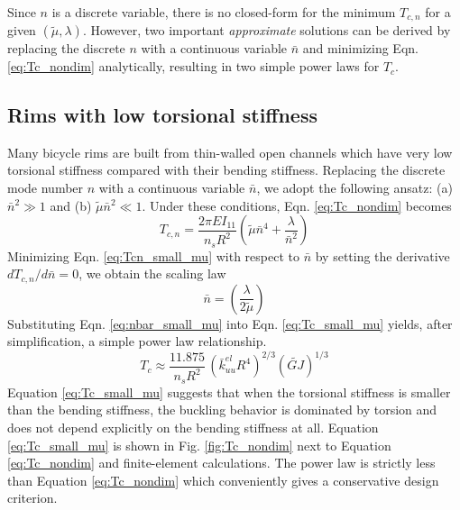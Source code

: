 \documentclass{bmd2016p}
\begin{document}
Since $n$ is a discrete variable, there is no closed-form for the minimum $T_{c,n}$ for a given $(\tilde{\mu},\lambda)$. However, two important \textit{approximate} solutions can be derived by replacing the discrete $n$ with a continuous variable $\bar{n}$ and minimizing Eqn. \ref{eq:Tc_nondim} analytically, resulting in two simple power laws for $T_c$.


\subsection{Rims with low torsional stiffness}\label{sec:powerlaw_1}
Many bicycle rims are built from thin-walled open channels which have very low torsional stiffness compared with their bending stiffness. Replacing the discrete mode number $n$ with a continuous variable $\bar{n}$, we adopt the following ansatz: (a) $\bar{n}^2 \gg 1$ and (b) $\tilde{\mu}\bar{n}^2 \ll 1$. Under these conditions, Eqn. \ref{eq:Tc_nondim} becomes
	\begin{equation}\label{eq:Tcn_small_mu}
	T_{c,n} = \frac{2\pi EI_{11}}{n_sR^2} \left( \tilde{\mu}\bar{n}^4 + \frac{\lambda}{\bar{n}^2}\right)
	\end{equation}
Minimizing Eqn. \ref{eq:Tcn_small_mu} with respect to $\bar{n}$ by setting the derivative $dT_{c,n}/d\bar{n}=0$, we obtain the scaling law
	\begin{equation}\label{eq:nbar_small_mu}
	\bar{n} = \left(\frac{\lambda}{2\tilde{\mu}} \right)
	\end{equation}
Substituting Eqn. \ref{eq:nbar_small_mu} into Eqn. \ref{eq:Tc_small_mu} yields, after simplification, a simple power law relationship.
	\begin{equation}\label{eq:Tc_small_mu}
	T_c \approx \frac{11.875}{n_sR^2} \, \left(\bar{k}_{uu}^{el}R^4 \right)^{2/3} (\widetilde{GJ})^{1/3}
	\end{equation}
Equation \ref{eq:Tc_small_mu} suggests that when the torsional stiffness is smaller than the bending stiffness, the buckling behavior is dominated by torsion and does not depend explicitly on the bending stiffness at all. Equation \ref{eq:Tc_small_mu} is shown in Fig. \ref{fig:Tc_nondim} next to Equation \ref{eq:Tc_nondim} and finite-element calculations. The power law is strictly less than Equation \ref{eq:Tc_nondim} which conveniently gives a conservative design criterion.
\end{document}
